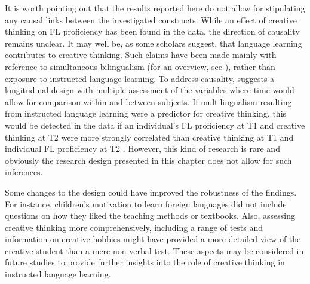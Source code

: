 \documentclass[output=paper]{langsci/langscibook}
\begin{document}
It is worth pointing out that the results reported here do not allow for stipulating any causal links between the investigated constructs. While an effect of creative thinking on FL proficiency has been found in the data, the direction of causality remains unclear. It may well be, as some scholars suggest, that language learning contributes to creative thinking. Such claims have been made mainly with reference to simultaneous bilingualism (for an overview, see \citealt{Ricciardelli1992}), rather than exposure to instructed language learning. To address causality, \citet{Simonton2008} suggests a longitudinal design with multiple assessment of the variables where time would allow for comparison within and between subjects. If multilingualism resulting from instructed language learning were a predictor for creative thinking, this would be detected in the data if an individual’s FL proficiency at T1 and creative thinking at T2 were more strongly correlated than creative thinking at T1 and individual FL proficiency at T2 \citep[154]{Simonton2008}. However, this kind of research is rare and obviously the research design presented in this chapter does not allow for such inferences.

Some changes to the design could have improved the robustness of the findings. For instance, children’s motivation to learn foreign languages did not include questions on how they liked the teaching methods or textbooks. Also, assessing creative thinking more comprehensively, including a range of tests and information on creative hobbies might have provided a more detailed view of the creative student than a mere non-verbal test. These aspects may be considered in future studies to provide further insights into the role of creative thinking in instructed language learning. 

{\sloppy\printbibliography[heading=subbibliography,notkeyword=this]}
\end{document}
